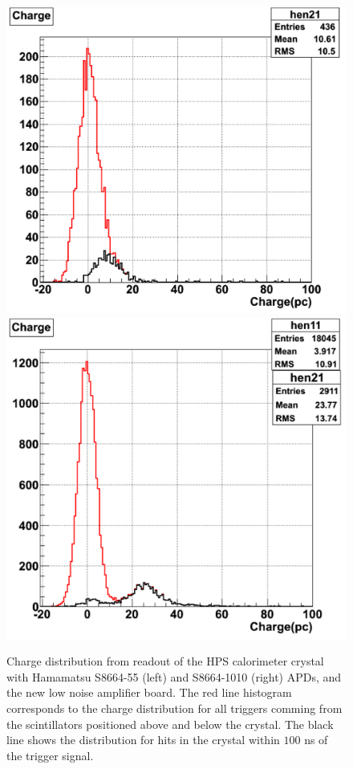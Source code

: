 \begin{figure}[t]
\includegraphics[scale=0.37]{ecal/MIP_5x5_APD.png}
\includegraphics[scale=0.37]{ecal/MIP_10x10_APD.png}
\caption{\small{Charge distribution from readout of the HPS calorimeter crystal with Hamamatsu S8664-55 (left) and S8664-1010 
(right) APDs, and the new low noise amplifier board. The red line histogram corresponds to the charge distribution for all triggers 
comming from the scintillators positioned above and below the crystal. The black line shows the distribution for hits in the crystal 
within $100$ ns of the trigger signal. }}\label{fig:mip10x10}
\end{figure}

